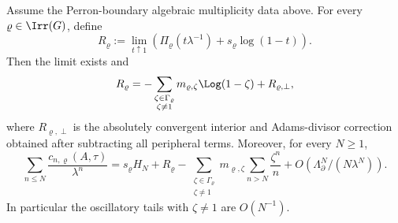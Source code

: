\begin{proposition}
  \label{prop:renormalized-class-mertens-component}
  Assume the Perron-boundary algebraic multiplicity data above.  For every
  \(\varrho\in\Irr(G)\), define
  \begin{equation}\label{eq:renormalized-primitive-channel-finite-part}
    R_\varrho:=
    \lim_{t\uparrow1}
      \left(\Pi_\varrho(t\lambda^{-1})+s_\varrho\log(1-t)\right).
  \end{equation}
  Then the limit exists and
  \begin{equation}\label{eq:renormalized-primitive-channel-constant}
    R_\varrho=
    -\sum_{\substack{\zeta\in\Gamma_\varrho\\\zeta\ne1}}
      m_{\varrho,\zeta}\Log(1-\zeta)
    +R_{\varrho,\perp},
  \end{equation}
  where \(R_{\varrho,\perp}\) is the absolutely convergent interior and
  Adams-divisor correction obtained after subtracting all peripheral
  terms.  Moreover, for every \(N\ge1\),
  \begin{equation}\label{eq:renormalized-channel-partial-sum}
    \sum_{n\le N}\frac{c_{n,\varrho}(A,\tau)}{\lambda^n}
    =
    s_\varrho H_N
    +R_\varrho
    -
    \sum_{\substack{\zeta\in\Gamma_\varrho\\\zeta\ne1}}
      m_{\varrho,\zeta}\sum_{n>N}\frac{\zeta^n}{n}
    +O(\Lambda_\partial^N/(N\lambda^N)).
  \end{equation}
  In particular the oscillatory tails with \(\zeta\ne1\) are
  \(O(N^{-1})\).


\end{proposition}
